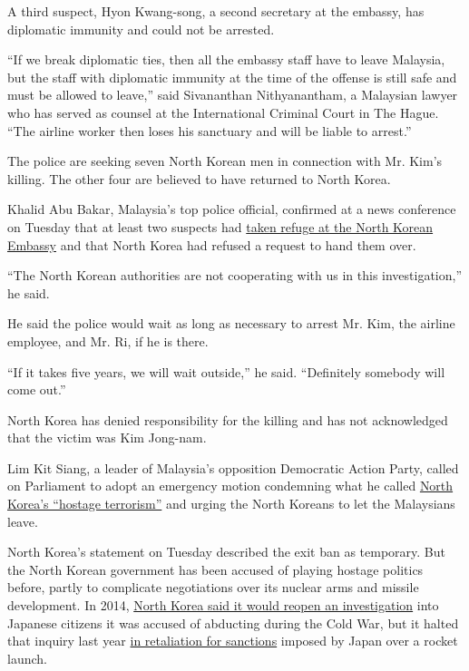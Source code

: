 A third suspect, Hyon Kwang-song, a second secretary at the embassy, has
diplomatic immunity and could not be arrested.

``If we break diplomatic ties, then all the embassy staff have to leave
Malaysia, but the staff with diplomatic immunity at the time of the
offense is still safe and must be allowed to leave,'' said Sivananthan
Nithyanantham, a Malaysian lawyer who has served as counsel at the
International Criminal Court in The Hague. ``The airline worker then
loses his sanctuary and will be liable to arrest.''

The police are seeking seven North Korean men in connection with Mr.
Kim's killing. The other four are believed to have returned to North
Korea.

Khalid Abu Bakar, Malaysia's top police official, confirmed at a news
conference on Tuesday that at least two suspects had
\href{https://www.nytimes.com/2017/03/01/world/asia/malaysia-kim-jong-nam-embassy-immunity.html}{taken
refuge at the North Korean Embassy} and that North Korea had refused a
request to hand them over.

``The North Korean authorities are not cooperating with us in this
investigation,'' he said.

He said the police would wait as long as necessary to arrest Mr. Kim,
the airline employee, and Mr. Ri, if he is there.

``If it takes five years, we will wait outside,'' he said. ``Definitely
somebody will come out.''

North Korea has denied responsibility for the killing and has not
acknowledged that the victim was Kim Jong-nam.

Lim Kit Siang, a leader of Malaysia's opposition Democratic Action
Party, called on Parliament to adopt an emergency motion condemning what
he called
\href{https://blog.limkitsiang.com/2017/03/07/parliament-should-adopt-an-all-party-emergency-motion-tomorrow-to-condemn-north-koreas-hostage-terrorism-and-to-call-on-north-korea-regime-to-immediately-revoke-the-ban-on-m/\#more-36730}{North
Korea's ``hostage terrorism''} and urging the North Koreans to let the
Malaysians leave.

North Korea's statement on Tuesday described the exit ban as temporary.
But the North Korean government has been accused of playing hostage
politics before, partly to complicate negotiations over its nuclear arms
and missile development. In 2014,
\href{https://www.nytimes.com/2014/05/30/world/asia/north-korea-agrees-to-investigate-fate-of-japanese-abducted-decades-ago.html}{North
Korea said it would reopen an investigation} into Japanese citizens it
was accused of abducting during the Cold War, but it halted that inquiry
last year
\href{https://www.nytimes.com/2016/02/14/world/asia/north-korea-japan-abductions.html}{in
retaliation for sanctions} imposed by Japan over a rocket launch.

